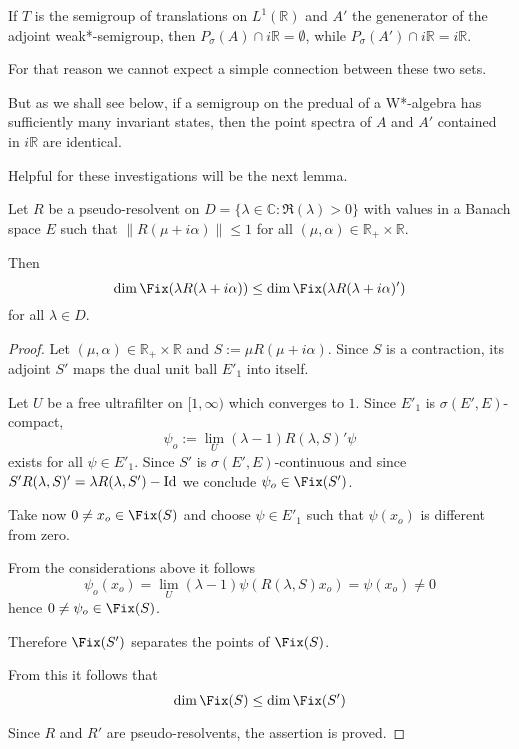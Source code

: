 
If $T$ is the semigroup of translations on $L^1(\mathbb{R})$ and $A'$ the genenerator 
of the adjoint weak*-semigroup, then $P_{\sigma}(A) \cap i\mathbb{R} = \emptyset$, while $P_{\sigma}(A') \cap i\mathbb{R} = i\mathbb{R}$.

For that reason we cannot expect a simple connection between these two sets.

But as we shall see below, if a semigroup on the predual of a W*-algebra has sufficiently many invariant states, then the point spectra of $A$ and $A'$ contained in $i\mathbb{R}$ are identical.

Helpful for these investigations will be the next lemma.

\begin{lemma}\label{lem:d3-1-6}
Let $R$ be a pseudo-resolvent on $D = \{\lambda \in \mathbb{C} : \Re(\lambda) > 0\}$ with values in a Banach space $E$ such that $\|R(\mu + i\alpha)\| \leq 1$ for all $(\mu,\alpha) \in \mathbb{R}_{+} \times \mathbb{R}$.

Then
\[
\dim \Fix(\lambda R(\lambda + i\alpha)) \leq \dim \Fix(\lambda R(\lambda + i\alpha)')
\]
for all $\lambda \in D$.
\end{lemma}

\begin{proof}
Let $(\mu,\alpha) \in \mathbb{R}_{+} \times \mathbb{R}$ and $S := \mu R(\mu + i\alpha)$.
Since $S$ is a contraction, its adjoint $S'$ maps the dual unit ball $E'_{1}$ into itself.

Let $U$ be a free ultrafilter on $[1,\infty)$ which converges to $1$.
Since $E'_{1}$ is $\sigma(E',E)$-compact,
\[
\psi_{o} := \lim_{U}(\lambda - 1)R(\lambda,S)'\psi
\]
exists for all $\psi \in E'_{1}$.
Since $S'$ is $\sigma(E',E)$-continuous and since $S'R(\lambda,S)' = \lambda R(\lambda,S')-\operatorname{Id}$ we conclude $\psi_{o} \in \Fix(S')$.

Take now $0 \neq x_{o} \in \Fix(S)$ and choose $\psi \in E'_{1}$ such that $\psi(x_{o})$ is different from zero.

From the considerations above it follows
\[
\psi_{o}(x_{o}) = \lim_{U}(\lambda - 1)\psi(R(\lambda,S)x_{o}) = \psi(x_{o}) \neq 0
\]
hence $0 \neq \psi_{o} \in \Fix(S)$.

Therefore $\Fix(S')$ separates the points of $\Fix(S)$.

From this it follows that
\[
\dim \Fix(S) \leq \dim \Fix(S')
\]

Since $R$ and $R'$ are pseudo-resolvents, the assertion is proved.
\end{proof}

